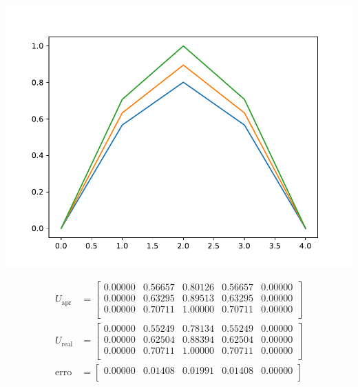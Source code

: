 \documentclass[a4paper, 11pt]{report}
\begin{document}
\begin{enumerate}[leftmargin=*]
        \begin{minipage}{0.35\columnwidth}
            \includegraphics[width=\columnwidth]{../edp/12.2_1.pdf}
        \end{minipage}
        \begin{minipage}{0.6\columnwidth}
            \begin{align*}
                U_{\text{apr}} &= 
                \begin{bmatrix}
                    0.00000 & 0.56657 &  0.80126 &  0.56657 &  0.00000\\  
                    0.00000 & 0.63295 &  0.89513 &  0.63295 &  0.00000\\  
                    0.00000 & 0.70711 &  1.00000 &  0.70711 &  0.00000\\  
                \end{bmatrix}\\
                U_{\text{real}} &=
                \begin{bmatrix}
                    0.00000  & 0.55249 &  0.78134 &  0.55249 &  0.00000\\  
                    0.00000  & 0.62504 &  0.88394 &  0.62504 &  0.00000\\  
                    0.00000  & 0.70711 &  1.00000 &  0.70711 &  0.00000\\ 
                \end{bmatrix}\\
                \text{erro} &= 
                \begin{bmatrix}
                    0.00000 &  0.01408 &  0.01991 &  0.01408 &  0.00000\\  

\end{bmatrix}
\end{align*}
\end{minipage}
\end{enumerate}
\end{document}
